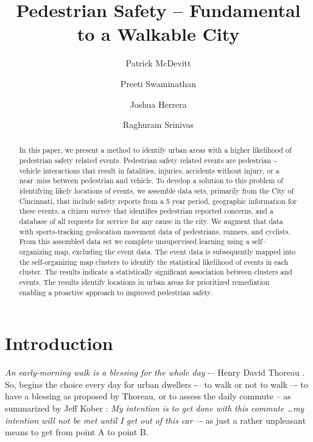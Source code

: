 \documentclass{llncs}
\begin{document}
\setlength{\parskip}{0pt}
%
%
\title{Pedestrian Safety -- Fundamental to a Walkable City}
%
\author{Patrick McDevitt \and Preeti Swaminathan
\and Joshua Herrera \and Raghuram Srinivas}
%

\maketitle              %

\begin{abstract}
In this paper, we present a method to identify urban areas with a higher likelihood of pedestrian safety related events. Pedestrian safety related events are pedestrian–-vehicle interactions that result in fatalities, injuries, accidents without injury, or a near--miss between pedestrian and vehicle. To develop a solution to this problem of identifying likely locations of events, we assemble data sets, primarily from the City of Cincinnati, that include safety reports from a 5 year period, geographic information for these events, a citizen survey that identifies pedestrian reported concerns, and a database of all requests for service for any cause in the city. We augment that data with sports-tracking geolocation movement data of pedestrians, runners, and cyclists. From this assembled data set we complete unsupervised learning using a self--organizing map, excluding the event data. The event data is subsequently mapped into the self-organizing map clusters to identify the statistical likelihood of events in each cluster. The results indicate a statistically significant association between clusters and events. The results identify locations in urban areas for prioritized remediation enabling a proactive approach to improved pedestrian safety.
\end{abstract}
%
\section{Introduction}
%
\emph{An early-morning walk is a blessing for the whole day} -– Henry David Thoreau \cite{thoreau1906writings}. So, begins the choice every day for urban dwellers -– to walk or not to walk –- to have a blessing as proposed by Thoreau, or to assess the daily commute -- as summarized by Jeff Kober \cite{bowen2015zen}: \emph{My intention is to get done with this commute \dots my intention will not be met until I get out of this car} –- as just a rather unpleasant means to get from point A to point B.
\end{document}
